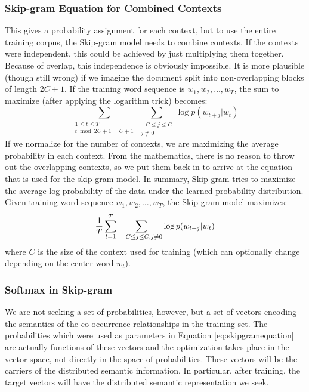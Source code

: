 \subsubsection{Skip-gram Equation for Combined Contexts}
This gives a probability assignment for each context, but to use the entire
training corpus, the Skip-gram model needs to combine contexts. If the contexts
were independent, this could be achieved by just multiplying them together.
Because of overlap, this independence is obviously impossible. It is more
plausible (though still wrong) if we imagine the document split into 
non-overlapping blocks of length $2C+1$. If 
the training word sequence is $w_1, w_2, \ldots, w_T$, the 
sum to maximize (after applying the logarithm trick) becomes:
%
\[\sum_{\substack{1 \le t \le T \\ t \bmod 2C+1 = C+1 }}\sum_{\substack{-C \le j \le C \\ j \ne 0 }} \log{p(w_{t+j}|w_t)}\]
%
If we normalize for the number of contexts, we are maximizing the average
probability in each context. From the mathematics, there is no reason to throw
out the overlapping contexts, so we put them back in to arrive at the equation
that is used for the skip-gram model. In summary, Skip-gram 
tries to maximize the average 
log-probability of the data under the learned probability distribution. Given
training word sequence $w_1, w_2, \ldots, w_T$, the Skip-gram model maximizes:
%
\begin{equation}
  \label{eq:skipgramequation}
  \frac{1}{T}\sum_{t=1}^T \; \sum_{-C \le j \le C, \\ j \ne 0 } \log p(w_{t+j}|w_t)
\end{equation}
%
where $C$ is the size of the context used for training (which can optionally 
change depending on the center word $w_t$). 

\subsubsection{Softmax in Skip-gram}

We are not seeking a set of probabilities, however, but a set of vectors 
encoding the semantics of the co-occurrence relationships in the training set.
The probabilities which were used as parameters
in Equation \ref{eq:skipgramequation} are actually functions of these vectors
and the optimization takes place in the vector space, not directly in the space
of probabilities. These vectors will be the carriers of the distributed semantic
information. In particular, after training, the target vectors will have 
the distributed semantic representation we seek. 

